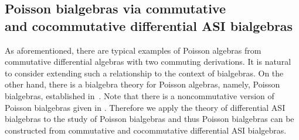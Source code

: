 \documentclass[pdftex]{sigma}
\numberwithin{equation}{section}
\begin{document}
\subsection[Poisson bialgebras via commutative and cocommutative differential ASI bialgebras]{Poisson bialgebras via commutative\\ and cocommutative differential ASI bialgebras}

As aforementioned, there are typical examples of Poisson algebras
from commutative differential algebras with two commuting
derivations. It is natural to consider extending such a
relationship to the context of bialgebras. On the other hand,
there is a bialgebra theory for Poisson algebras, namely, Poisson
bialgebras, established in~\cite{ni2013poisson}. Note that there
is a noncommutative version of Poisson bialgebras given in
\cite{liu2020noncommutative}. Therefore we apply the theory of
differential ASI bialgebras to the study of Poisson bialgebras and
thus Poisson bialgebras can be constructed from commutative and
cocommutative differential ASI bialgebras.
\end{document}

